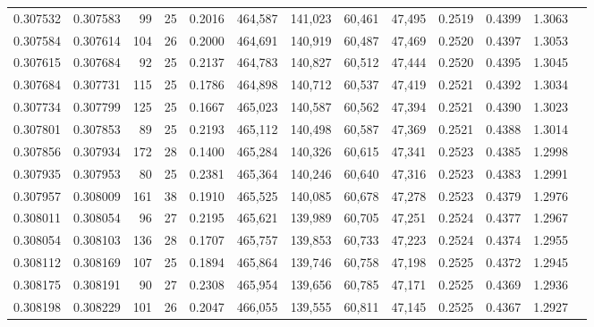 \begin{tabular}{rrrrrrrrrrrrr}
0.307532 & 0.307583 &    99 &  25 &                                     0.2016 & 464,587 & 141,023 &  60,461 &  47,495 & 0.2519 & 0.4399 & 1.3063 \\
0.307584 & 0.307614 &   104 &  26 &                                     0.2000 & 464,691 & 140,919 &  60,487 &  47,469 & 0.2520 & 0.4397 & 1.3053 \\
0.307615 & 0.307684 &    92 &  25 &                                     0.2137 & 464,783 & 140,827 &  60,512 &  47,444 & 0.2520 & 0.4395 & 1.3045 \\
0.307684 & 0.307731 &   115 &  25 &                                     0.1786 & 464,898 & 140,712 &  60,537 &  47,419 & 0.2521 & 0.4392 & 1.3034 \\
0.307734 & 0.307799 &   125 &  25 &                                     0.1667 & 465,023 & 140,587 &  60,562 &  47,394 & 0.2521 & 0.4390 & 1.3023 \\
0.307801 & 0.307853 &    89 &  25 &                                     0.2193 & 465,112 & 140,498 &  60,587 &  47,369 & 0.2521 & 0.4388 & 1.3014 \\
0.307856 & 0.307934 &   172 &  28 &                                     0.1400 & 465,284 & 140,326 &  60,615 &  47,341 & 0.2523 & 0.4385 & 1.2998 \\
0.307935 & 0.307953 &    80 &  25 &                                     0.2381 & 465,364 & 140,246 &  60,640 &  47,316 & 0.2523 & 0.4383 & 1.2991 \\
0.307957 & 0.308009 &   161 &  38 &                                     0.1910 & 465,525 & 140,085 &  60,678 &  47,278 & 0.2523 & 0.4379 & 1.2976 \\
0.308011 & 0.308054 &    96 &  27 &                                     0.2195 & 465,621 & 139,989 &  60,705 &  47,251 & 0.2524 & 0.4377 & 1.2967 \\
0.308054 & 0.308103 &   136 &  28 &                                     0.1707 & 465,757 & 139,853 &  60,733 &  47,223 & 0.2524 & 0.4374 & 1.2955 \\
0.308112 & 0.308169 &   107 &  25 &                                     0.1894 & 465,864 & 139,746 &  60,758 &  47,198 & 0.2525 & 0.4372 & 1.2945 \\
0.308175 & 0.308191 &    90 &  27 &                                     0.2308 & 465,954 & 139,656 &  60,785 &  47,171 & 0.2525 & 0.4369 & 1.2936 \\
0.308198 & 0.308229 &   101 &  26 &                                     0.2047 & 466,055 & 139,555 &  60,811 &  47,145 & 0.2525 & 0.4367 & 1.2927 \\

\end{tabular}
